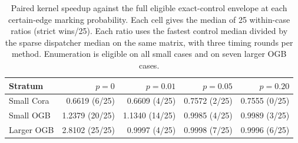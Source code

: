 \begin{table}[htbp]
\centering
\caption{Paired kernel speedup against the full eligible exact-control envelope at each certain-edge marking probability. Each cell gives the median of 25 within-case ratios (strict wins/25). Each ratio uses the fastest control median divided by the sparse dispatcher median on the same matrix, with three timing rounds per method. Enumeration is eligible on all small cases and on seven larger OGB cases.}
\label{tab:endpoint-envelope}
\small
\begin{tabular}{lrrrr}
\toprule
Stratum & $p=0$ & $p=0.01$ & $p=0.05$ & $p=0.20$ \\
\midrule
Small Cora & 0.6619 (6/25) & 0.6609 (4/25) & 0.7572 (2/25) & 0.7555 (0/25) \\
Small OGB & 1.2379 (20/25) & 1.1340 (14/25) & 0.9985 (4/25) & 0.9989 (3/25) \\
Larger OGB & 2.8102 (25/25) & 0.9997 (4/25) & 0.9998 (7/25) & 0.9996 (6/25) \\
\bottomrule
\end{tabular}
\end{table}
